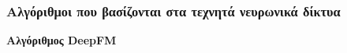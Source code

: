 \subsubsection{Αλγόριθμοι που βασίζονται στα τεχνητά νευρωνικά δίκτυα}
\noindent\textbf{Αλγόριθμος DeepFM}\\
